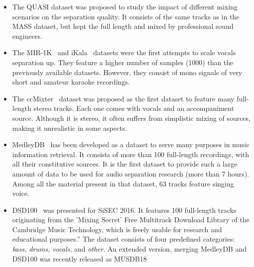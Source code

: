 \begin{itemize}[leftmargin=*]
    \item The QUASI dataset was proposed to study the impact of different mixing scenarios on the separation quality. It consists of the same tracks as in the MASS dataset, but kept the full length and mixed by professional sound engineers.
    \item The MIR-1K~\cite{hsu10} and iKala~\cite{chan15} datasets were the first attempts to scale vocals separation up. They feature a higher number of samples (1000) than the previously available datasets. However, they consist of mono signals of very short and amateur karaoke recordings.
    \item The ccMixter~\cite{liutkus142} dataset was proposed as the first dataset to feature many full-length stereo tracks. Each one comes with vocals and an accompaniment source. Although it is stereo, it often suffers from simplistic mixing of sources, making it unrealistic in some aspects.
    \item MedleyDB~\cite{bittner14} has been developed as a dataset to serve many purposes in music information retrieval. It consists of more than 100 full-length recordings, with all their constitutive sources. It is the first dataset to provide such a large amount of data to be used for audio separation research (more than 7 hours). Among all the material present in that dataset, 63 tracks feature singing voice.
    \item DSD100~\cite{liutkus17} was presented for SiSEC 2016. It features 100 full-length tracks originating from the 'Mixing Secret' Free Multitrack Download Library of the Cambridge Music Technology, which is freely usable for research and educational purposes.''
    The dataset consists of four predefined categories: \emph{bass, drums, vocals}, and \emph{other}. An extended version, merging MedleyDB and DSD100 was recently released as MUSDB18~\cite{rafii17, stoeter18sisec}
\end{itemize}

